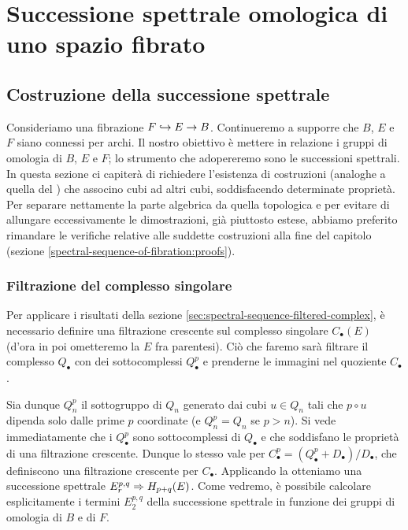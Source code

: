 \chapter{Successione spettrale omologica di uno spazio fibrato}

\section{Costruzione della successione spettrale}
Consideriamo una fibrazione $F\hookrightarrow E\to B$. Continueremo a supporre che $B$, $E$ e $F$ siano connessi per archi. Il nostro obiettivo è mettere in relazione i gruppi di omologia di $B$, $E$ e $F$; lo strumento che adopereremo sono le successioni spettrali. In questa sezione ci capiterà di richiedere l'esistenza di costruzioni (analoghe a quella del ) che associno cubi ad altri cubi, soddisfacendo determinate proprietà. Per separare nettamente la parte algebrica da quella topologica e per evitare di allungare eccessivamente le dimostrazioni, già piuttosto estese, abbiamo preferito rimandare le verifiche relative alle suddette costruzioni alla fine del capitolo (sezione \ref{spectral-sequence-of-fibration:proofs}).

\subsection{Filtrazione del complesso singolare}
Per applicare i risultati della sezione \ref{sec:spectral-sequence-filtered-complex}, è necessario definire una filtrazione crescente sul complesso singolare $C_\bullet(E)$ (d'ora in poi ometteremo la $E$ fra parentesi). Ciò che faremo sarà filtrare il complesso $Q_\bullet$ con dei sottocomplessi $Q^p_\bullet$ e prenderne le immagini nel quoziente $C_\bullet$.

Sia dunque $Q^p_n$ il sottogruppo di $Q_n$ generato dai cubi $u\in Q_n$ tali che $p\circ u$ dipenda solo dalle prime $p$ coordinate (e $Q^p_n=Q_n$ se $p>n$). Si vede immediatamente che i $Q^p_\bullet$ sono sottocomplessi di $Q_\bullet$ e che soddisfano le proprietà di una filtrazione crescente. Dunque lo stesso vale per $C^p_\bullet=(Q^p_\bullet+D_\bullet)/D_\bullet$, che definiscono una filtrazione crescente per $C_\bullet$. Applicando la  otteniamo una successione spettrale $E^{p,q}_r\Rightarrow H_{p+q}(E)$. Come vedremo, è possibile calcolare esplicitamente i termini $E^{p,q}_2$ della successione spettrale in funzione dei gruppi di omologia di $B$ e di $F$.

